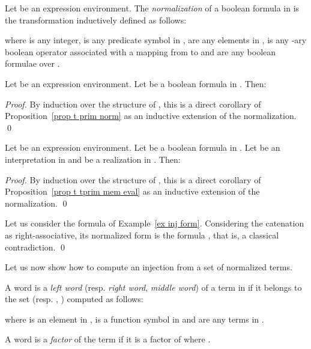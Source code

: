 \documentclass[a4paper]{llncs}
\begin{document}
  
  \begin{definition}
    Let  be an expression environment. The \emph{normalization} of a boolean formula  in  is the transformation  inductively defined as follows:
        
        where  is any integer,  is any predicate symbol in ,  are any  elements in ,  is any -ary boolean operator associated with a mapping  from  to  and  are any  boolean formulae over .
  \end{definition}
  
  \begin{proposition}
    Let  be an expression environment. Let  be a boolean formula in . Then:
         
  \end{proposition}
  \begin{proof}
    By induction over the structure of , this is a direct corollary of Proposition~\ref{prop t prim norm} as an inductive extension of the normalization.
    \qed
  \end{proof}
  
  \begin{proposition}\label{prop normalization preserv eval}
    Let  be an expression environment. Let  be a boolean formula in . Let  be an interpretation in  and  be a realization in . Then:
        
  \end{proposition}
  \begin{proof}
    By induction over the structure of , this is a direct corollary of Proposition~\ref{prop t tprim mem eval} as an inductive extension of the normalization.
    \qed
  \end{proof}
  
  \begin{example}
    Let us consider the formula  of Example~\ref{ex inj form}. Considering the catenation as right-associative, its normalized form is the formula , that is, a classical contradiction.
    \qed
  \end{example}
  
  Let us now show how to compute an injection from a set of normalized terms.
  
  \begin{definition}
        A word is a \emph{left word} (resp. \emph{right word}, \emph{middle word}) of a term  in  if it belongs to the set  (resp. , ) computed as follows:
        
        where  is an element in ,  is a function symbol in  and  are any  terms in .
    
    A word  is a \emph{factor} of the term  if it is a factor of  where . 
  \end{definition}
  
\end{document}
